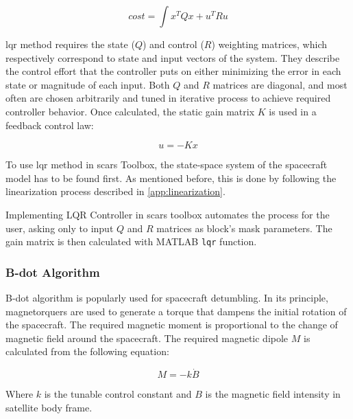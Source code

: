         \begin{equation}
            cost = \int{x^TQx+u^TRu}
        \end{equation}\label{eqn:lqrcost}
        
        \ac{lqr} method requires the state ($Q$) and control ($R$) weighting matrices, which respectively correspond to state and input vectors of the system. They describe the control effort that the controller puts on either minimizing the error in each state or magnitude of each input. Both $Q$ and $R$ matrices are diagonal, and most often are chosen arbitrarily and tuned in iterative process to achieve required controller behavior. Once calculated, the static gain matrix $K$ is used in a feedback control law:

        \begin{equation}
            u = -Kx
        \end{equation}

        To use \ac{lqr} method in \ac{scars} Toolbox, the state-space system of the spacecraft model has to be found first. As mentioned before, this is done by following the linearization process described in \autoref{app:linearization}.

        Implementing LQR Controller in \ac{scars} toolbox automates the process for the user, asking only to input $Q$ and $R$ matrices as block's mask parameters. The gain matrix is then calculated with MATLAB \verb|lqr| function.


    \subsubsection{B-dot Algorithm}\label{sec:bdot}
        B-dot algorithm is popularly used for spacecraft detumbling. In its principle, magnetorquers are used to generate a torque that dampens the initial rotation of the spacecraft. The required magnetic moment is proportional to the change of magnetic field around the spacecraft. The required magnetic dipole $M$ is calculated from the following equation:

        \begin{equation}
            M = -k\dot{B}
        \end{equation} 

        Where $k$ is the tunable control constant and $B$ is the magnetic field intensity in satellite body frame\cite{capo2014b}.

